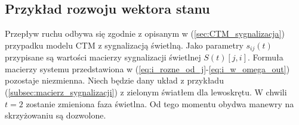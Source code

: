 \documentclass[12pt]{book}
\theoremstyle{plain}
\newcommand{\myref}[1]{(\ref{#1})}
\begin{document}
\subsection*{Przykład rozwoju wektora stanu} \label{sec:rozwoj_sieci_sygnalizcja_przypadek}
Przepływ ruchu odbywa się zgodnie z opisanym w \myref{sec:CTM_sygnalizacja} przypadku modelu CTM z sygnalizacją świetlną. Jako parametry $s_{ij}(t)$ przypisane są wartości macierzy sygnalizacji świetlnej $S(t)[j,i]$. Formuła macierzy systemu przedstawiona w 
(\ref{eq:i_rozne_od_j}-\ref{eq:i_w_omega_out}) pozostaje niezmienna. \newline
Niech będzie dany układ z przykładu \myref{subsec:macierz_sygnalizacji} z zielonym światłem dla lewoskrętu. W chwili $t=2$ zostanie zmieniona faza świetlna. Od tego momentu obydwa manewry na skrzyżowaniu są dozwolone.  
\def \xzero{\begin{bmatrix}
		9 \\ 4 \\ 3 \\ 0 \\ 1 \\ 5
\end{bmatrix}}
\def \xI{\begin{bmatrix}
		0 \\ 12 \\ 1 \\ 3 \\ 0 \\ 1
\end{bmatrix}}
\def \xII{\begin{bmatrix}
		0 \\ 9 \\ 3 \\ 1 \\ 0 \\ 0
\end{bmatrix}}
\def \xIII{\begin{bmatrix}
		0 \\ 0 \\ 2 \frac{1}{4} \\ 3 \\ 7 \frac{3}{4} \\ 0
\end{bmatrix}}

\def \AZero{
	\begin{bmatrix}
		0 & 0            & 0 & 0 & 0 & 0 \\
		1 & \frac{3}{4}  & 0 & 0 & 0 & 0 \\
		0 & \frac{1}{4}  & 0 & 0 & 0 & 0 \\
		0 & 0            & 1 & 0 & 0 & 0 & \\
		0 & 0            & 0 & 0 & 0 & 0 \\
		0 & 0            & 0 & 0 & 1 & 0 \\
	\end{bmatrix}	
}
\end{document}
